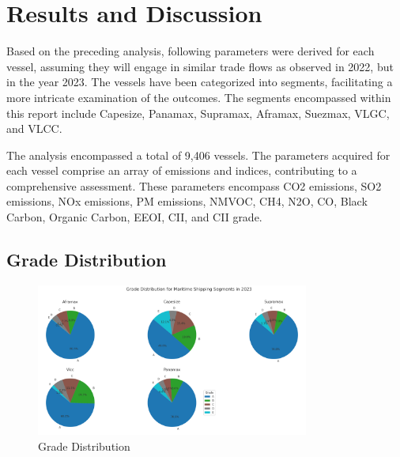 \chapter{Results and Discussion}

Based on the preceding analysis, following parameters were derived for each vessel, assuming they will engage in similar trade flows as observed in 2022, but in the year 2023. 
The vessels have been categorized into segments, facilitating a more intricate examination of the outcomes. The segments encompassed within this report include Capesize, Panamax, Supramax, Aframax, Suezmax, VLGC, and VLCC.

The analysis encompassed a total of 9,406 vessels. 
The parameters acquired for each vessel comprise an array of emissions and indices, contributing to a comprehensive assessment. 
These parameters encompass CO2 emissions, SO2 emissions, NOx emissions, PM emissions, NMVOC, CH4, N2O, CO, Black Carbon, Organic Carbon, EEOI, CII, and CII grade.

\section{Grade Distribution}

\begin{figure}[h]
    \centering
    \includegraphics[width=0.8\textwidth]{images/grade_distribution.png}
    \caption{Grade Distribution}
    \label{grade_distribution}
\end{figure}


